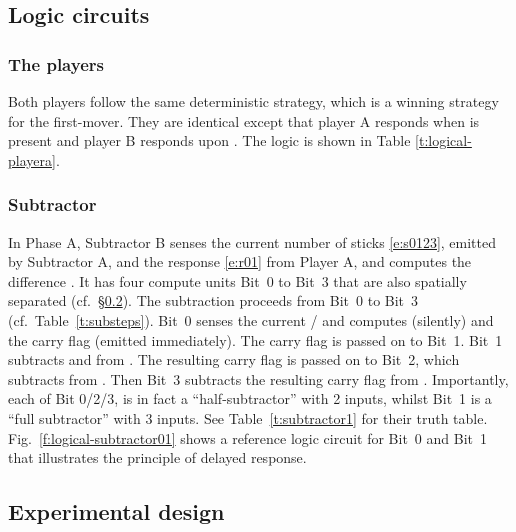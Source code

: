 \documentclass[12pt,notitlepage]{article}
\newcommand{\ra}[1]{{\color{Blue}#1}}
\begin{document}
\subsection{Logic circuits}


\subsubsection*{The players} \label{ss:players}

Both players
follow the same deterministic strategy,
which is a winning strategy for the first-mover.
%
They are identical except
that player A responds when  is present
and player B responds upon .
%
The logic is shown in Table \ref{t:logical-playera}.


\subsubsection*{Subtractor} \label{ss:sub}

\ra{
In Phase A,
Subtractor B 
senses the current number of sticks \eqref{e:s0123},
emitted by Subtractor A,
and 
the response \eqref{e:r01} from Player A,
and
computes the difference \ce{d}.
%
It has four compute units Bit~0 to Bit~3
that are also
spatially separated (cf.~\S\ref{ss:experiment}). 
%
The subtraction proceeds from Bit~0 to Bit~3
(cf.~Table~\ref{t:substeps}).
%
Bit~0 senses the current \ce{s_0}/\ce{r_0}
and computes \ce{d_0} (silently)
and the carry flag \ce{c_1} (emitted immediately).
%
The carry flag is passed on to Bit~1.
%
Bit~1 subtracts \ce{r_1} and \ce{c_1} from \ce{s_1}. 
%
The resulting carry flag \ce{c_2} 
is passed on to Bit~2, 
which subtracts \ce{c_2} from \ce{s_2}.
%
Then Bit~3 subtracts the resulting carry flag
\ce{c_3} from \ce{s_3}.
%
Importantly,
each of
Bit 0/2/3,
is in fact a ``half-subtractor'' with 2 inputs,
whilst
Bit~1 is a ``full subtractor'' with 3 inputs.
}
%
\ra{
See
Table~\ref{t:subtractor1}
for their truth table.
%
Fig.~\ref{f:logical-subtractor01}
shows a reference logic circuit 
for Bit~0 and Bit~1
that illustrates the principle of delayed response.
}
















\subsection{Experimental design} \label{ss:experiment}
\end{document}
